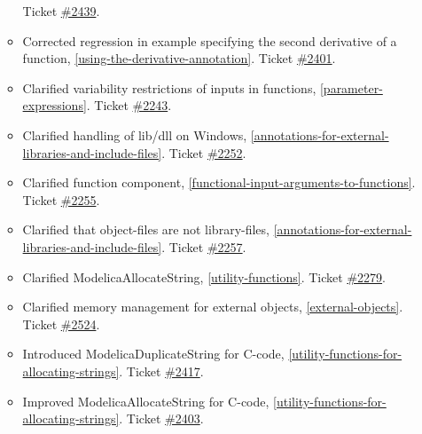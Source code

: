 \begin{itemize}
\begin{itemize}
Ticket \href{https://github.com/modelica/ModelicaSpecification/pull/2439}{\#2439}.
\item Corrected regression in example specifying the second derivative of a function, \cref{using-the-derivative-annotation}.
Ticket \href{https://github.com/modelica/ModelicaSpecification/pull/2401}{\#2401}.
\item Clarified variability restrictions of inputs in functions, \cref{parameter-expressions}.
Ticket \href{https://github.com/modelica/ModelicaSpecification/issues/2243}{\#2243}.
\item Clarified handling of lib/dll on Windows, \cref{annotations-for-external-libraries-and-include-files}.
Ticket \href{https://github.com/modelica/ModelicaSpecification/issues/2252}{\#2252}.
\item Clarified function component, \cref{functional-input-arguments-to-functions}.
Ticket \href{https://github.com/modelica/ModelicaSpecification/issues/2255}{\#2255}.
\item Clarified that object-files are not library-files, \cref{annotations-for-external-libraries-and-include-files}.
Ticket \href{https://github.com/modelica/ModelicaSpecification/issues/2257}{\#2257}.
\item Clarified ModelicaAllocateString, \cref{utility-functions}.
Ticket \href{https://github.com/modelica/ModelicaSpecification/issues/2279}{\#2279}.
\item Clarified memory management for external objects, \cref{external-objects}.
Ticket \href{https://github.com/modelica/ModelicaSpecification/issues/2524}{\#2524}.
\item Introduced ModelicaDuplicateString for C-code, \cref{utility-functions-for-allocating-strings}.
Ticket \href{https://github.com/modelica/ModelicaSpecification/issues/2417}{\#2417}.
\item Improved ModelicaAllocateString for C-code, \cref{utility-functions-for-allocating-strings}.
Ticket \href{https://github.com/modelica/ModelicaSpecification/issues/2403}{\#2403}.
\end{itemize}


\end{itemize}
